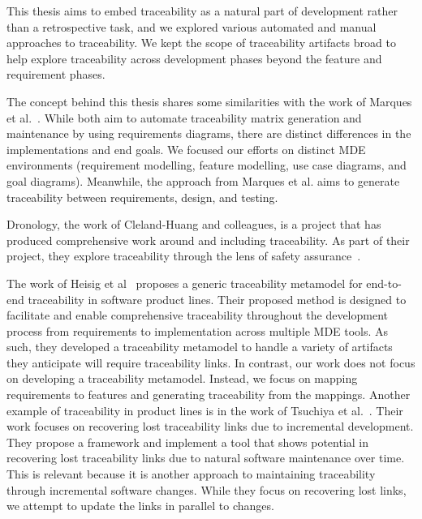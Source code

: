 This thesis aims to embed traceability as a natural part of development rather than a retrospective task, and we explored various automated and manual approaches to traceability. We kept the scope of traceability artifacts broad to help explore traceability across development phases beyond the feature and requirement phases.



The concept behind this thesis shares some similarities with the work of Marques et al.~\cite{6945504}. While both aim to automate traceability matrix generation and maintenance by using requirements diagrams, there are distinct differences in the implementations and end goals. We focused our efforts on distinct \gls{MDE} environments (requirement modelling, feature modelling, use case diagrams, and goal diagrams). Meanwhile, the approach from Marques et al. aims to generate traceability between requirements, design, and testing.

Dronology, the work of Cleland-Huang and colleagues, is a project that has produced comprehensive work around and including traceability. As part of their project, they explore traceability through the lens of safety assurance~\cite{Cleland-HuangBCSR07, AgrawalC23, DBLP:conf/splc/Cleland-HuangAI20, mirakhorli2011tracing}.


The work of Heisig et al~\cite{heisig2019generic} proposes a generic traceability metamodel for end-to-end traceability in software product lines. Their proposed method is designed to facilitate and enable comprehensive traceability throughout the development process from requirements to implementation across multiple MDE tools. As such, they developed a traceability metamodel to handle a variety of artifacts they anticipate will require traceability links. In contrast, our work does not focus on developing a traceability metamodel. Instead, we focus on mapping requirements to features and generating traceability from the mappings. Another example of traceability in product lines is in the work of Tsuchiya et al.~\cite{tsuchiya2013recovering}. Their work focuses on recovering lost traceability links due to incremental development. They propose a framework and implement a tool that shows potential in recovering lost traceability links due to natural software maintenance over time. This is relevant because it is another approach to maintaining traceability through incremental software changes. While they focus on recovering lost links, we attempt to update the links in parallel to changes.

